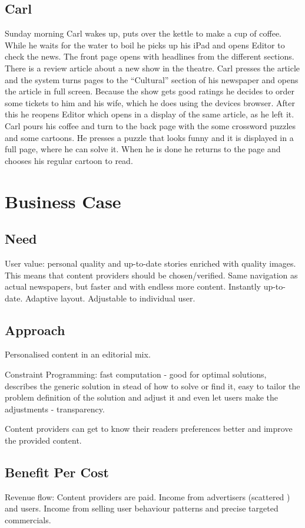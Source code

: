 \subsection{Carl}
Sunday morning Carl wakes up, puts over the kettle to make a cup of coffee. While he waits for the water to boil he picks up his iPad and opens Editor to check the news. The front page opens with headlines from the different sections. There is a review article about a new show in the theatre. Carl presses the article and the system turns pages to the ``Cultural'' section of his newspaper and opens the article in full screen. Because the show gets good ratings he decides to order some tickets to him and his wife, which he does using the devices browser. After this he reopens Editor which opens in a display of the same article, as he left it. Carl pours his coffee and turn to the back page with the some crossword puzzles and some cartoons. He presses a puzzle that looks funny and it is displayed in a full page, where he can solve it. When he is done he returns to the page and chooses his regular cartoon to read.

\section{Business Case}
\subsection{Need}
User value: personal quality and up-to-date stories enriched with quality images. This means that content providers should be chosen/verified. Same navigation as actual newspapers, but faster and with endless more content. Instantly up-to-date. Adaptive layout. Adjustable to individual user.

\subsection{Approach}
Personalised content in an editorial mix.

Constraint Programming: fast computation - good for optimal solutions, describes the generic solution in stead of how to solve or find it, easy to tailor the problem definition of the solution and adjust it and even let users make the adjustments - transparency.

Content providers can get to know their readers preferences better and improve the provided content.

\subsection{Benefit Per Cost}
Revenue flow: Content providers are paid. Income from advertisers (scattered \cite[p. 6-7]{kristin-fredrik.pdf}) and users. Income from selling user behaviour patterns and precise targeted commercials.

